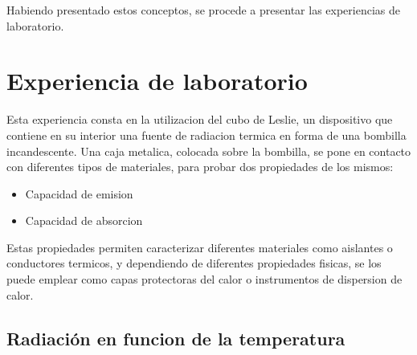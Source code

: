 \documentclass[a4paper,12pt]{report}
\begin{document}
  Habiendo presentado estos conceptos, se procede a presentar las experiencias de laboratorio.

\chapter{Experiencia de laboratorio}
  Esta experiencia consta en la utilizacion del cubo de Leslie, un dispositivo que contiene en su interior una fuente
  de radiacion termica en forma de una bombilla incandescente. Una caja metalica, colocada sobre la bombilla, se pone
  en contacto con diferentes tipos de materiales, para probar dos propiedades de los mismos:
  \begin{itemize}
    \item Capacidad de emision
    \item Capacidad de absorcion
  \end{itemize}

  Estas propiedades permiten caracterizar diferentes materiales como aislantes o conductores termicos, y dependiendo de
  diferentes propiedades fisicas, se los puede emplear como capas protectoras del calor o instrumentos de dispersion de
  calor.

  \section{Radiación en funcion de la temperatura}

  \begin{center}
  \end{center}

  \begin{center}
  \end{center}
\end{document}
